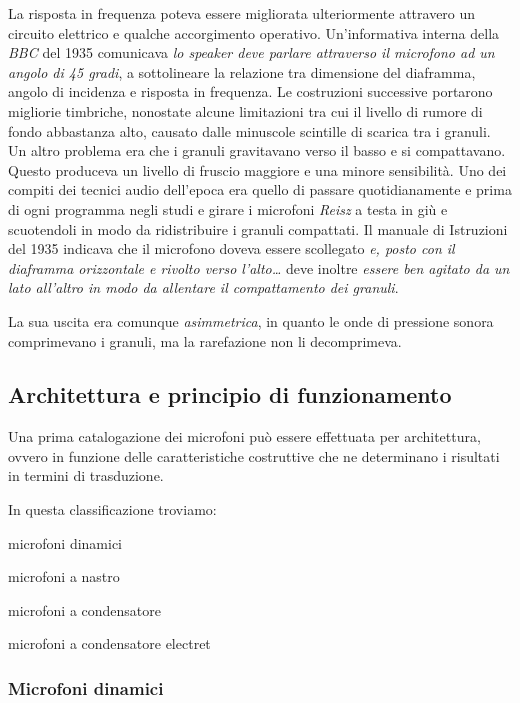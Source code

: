 \begin{refsection}
La risposta in frequenza poteva essere migliorata ulteriormente attravero un
circuito elettrico e qualche accorgimento operativo. Un'informativa interna
della \emph{BBC} del 1935 comunicava \emph{lo speaker deve
parlare attraverso il microfono ad un angolo di 45 gradi}, a sottolineare la relazione
tra dimensione del diaframma, angolo di incidenza e risposta in frequenza.
Le costruzioni successive portarono migliorie timbriche, nonostate alcune limitazioni
tra cui il livello di rumore di fondo abbastanza alto, causato dalle minuscole
scintille di scarica tra i granuli.
Un altro problema era che i granuli gravitavano verso il basso e
si compattavano. Questo produceva un livello di fruscio maggiore e una minore
sensibilità. Uno dei compiti dei tecnici audio dell’epoca era quello di passare
quotidianamente e prima di ogni programma negli studi e girare i microfoni
\emph{Reisz} a testa in giù e scuotendoli in modo da ridistribuire i granuli compattati.
Il manuale di Istruzioni del 1935 indicava che
il microfono doveva essere scollegato \emph{e, posto con il diaframma orizzontale
e rivolto verso l'alto\ldots} deve inoltre \emph{essere ben agitato da un lato all'altro in
modo da allentare il compattamento dei granuli}.

La sua uscita era comunque \emph{asimmetrica}, in quanto le onde di pressione
sonora comprimevano i granuli, ma la rarefazione non li decomprimeva.

\subsection{Architettura e principio di funzionamento}

Una prima catalogazione dei microfoni può essere effettuata per architettura,
ovvero in funzione delle caratteristiche costruttive che ne determinano i
risultati in termini di trasduzione.

In questa classificazione troviamo:

\begin{compactitem}
  \item microfoni dinamici
  \item microfoni a nastro
  \item microfoni a condensatore
  \item microfoni a condensatore electret
\end{compactitem}

\subsubsection{Microfoni dinamici}


\end{refsection}
